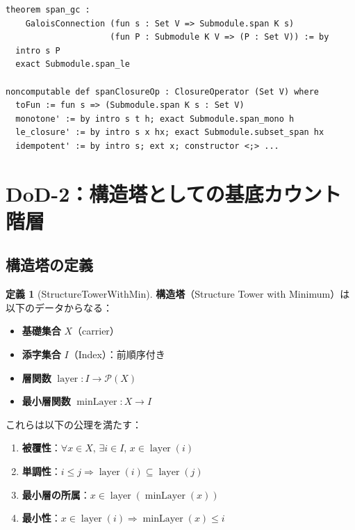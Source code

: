 \documentclass[a4paper,11pt]{ltjsarticle}
\theoremstyle{definition}
\newtheorem{definition}{定義}[section]
\begin{document}
\begin{leancode}
\begin{lstlisting}
theorem span_gc :
    GaloisConnection (fun s : Set V => Submodule.span K s)
                     (fun P : Submodule K V => (P : Set V)) := by
  intro s P
  exact Submodule.span_le

noncomputable def spanClosureOp : ClosureOperator (Set V) where
  toFun := fun s => (Submodule.span K s : Set V)
  monotone' := by intro s t h; exact Submodule.span_mono h
  le_closure' := by intro s x hx; exact Submodule.subset_span hx
  idempotent' := by intro s; ext x; constructor <;> ...
\end{lstlisting}
\end{leancode}

\section{DoD-2：構造塔としての基底カウント階層}

\subsection{構造塔の定義}

\begin{definition}[StructureTowerWithMin]
  \textbf{構造塔}（Structure Tower with Minimum）は以下のデータからなる：
  \begin{itemize}
    \item \textbf{基礎集合} $X$（carrier）
    \item \textbf{添字集合} $I$（Index）：前順序付き
    \item \textbf{層関数} $\operatorname{layer} : I \to \mathcal{P}(X)$
    \item \textbf{最小層関数} $\operatorname{minLayer} : X \to I$
  \end{itemize}
  これらは以下の公理を満たす：
  \begin{enumerate}
    \item \textbf{被覆性}：$\forall x \in X,\, \exists i \in I,\, x \in \operatorname{layer}(i)$
    \item \textbf{単調性}：$i \leq j \Rightarrow \operatorname{layer}(i) \subseteq \operatorname{layer}(j)$
    \item \textbf{最小層の所属}：$x \in \operatorname{layer}(\operatorname{minLayer}(x))$
    \item \textbf{最小性}：$x \in \operatorname{layer}(i) \Rightarrow \operatorname{minLayer}(x) \leq i$
  \end{enumerate}
\end{definition}
\end{document}
